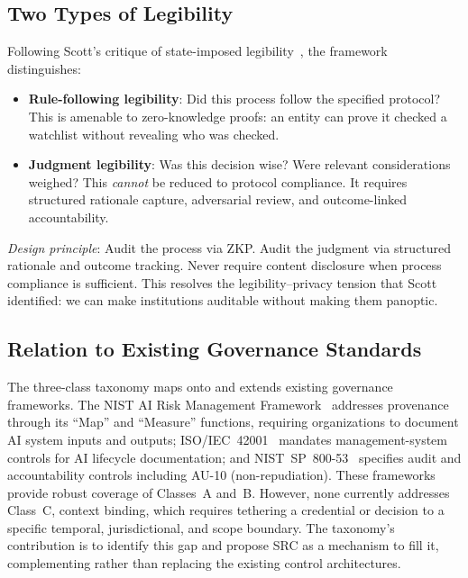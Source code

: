 \documentclass[runningheads]{llncs}
\begin{document}
\subsection{Two Types of Legibility}

Following Scott's critique of state-imposed legibility~\cite{scott1998seeing}, the framework distinguishes:

\begin{itemize}
\item \textbf{Rule-following legibility}: Did this process follow the specified protocol? This is amenable to zero-knowledge proofs: an entity can prove it checked a watchlist without revealing who was checked.
\item \textbf{Judgment legibility}: Was this decision wise? Were relevant considerations weighed? This \emph{cannot} be reduced to protocol compliance. It requires structured rationale capture, adversarial review, and outcome-linked accountability.
\end{itemize}

\emph{Design principle}: Audit the process via ZKP. Audit the judgment via structured rationale and outcome tracking. Never require content disclosure when process compliance is sufficient. This resolves the legibility--privacy tension that Scott identified: we can make institutions auditable without making them panoptic.

\subsection{Relation to Existing Governance Standards}

The three-class taxonomy maps onto and extends existing governance frameworks. The NIST AI Risk Management Framework~\cite{nist2023airm,nist2024genai} addresses provenance through its ``Map'' and ``Measure'' functions, requiring organizations to document AI system inputs and outputs; ISO/IEC~42001~\cite{iso42001} mandates management-system controls for AI lifecycle documentation; and NIST~SP~800-53~\cite{nist2020sp800} specifies audit and accountability controls including AU-10 (non-repudiation). These frameworks provide robust coverage of Classes~A and~B. However, none currently addresses Class~C, context binding, which requires tethering a credential or decision to a specific temporal, jurisdictional, and scope boundary. The taxonomy's contribution is to identify this gap and propose SRC as a mechanism to fill it, complementing rather than replacing the existing control architectures.
\end{document}
